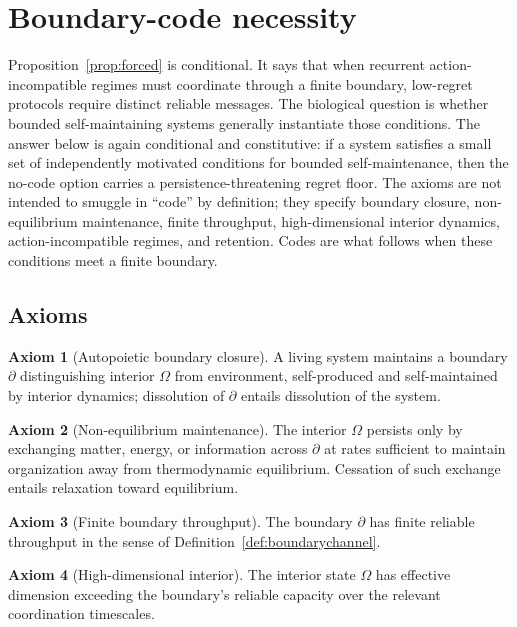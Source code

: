 \documentclass[12pt]{article}
\theoremstyle{definition}
\newtheorem{axiom}{Axiom}
\begin{document}
\section{Boundary-code necessity}
\label{sec:universal}

Proposition~\ref{prop:forced} is conditional. It says that when recurrent action-incompatible regimes must coordinate through a finite boundary, low-regret protocols require distinct reliable messages. The biological question is whether bounded self-maintaining systems generally instantiate those conditions. The answer below is again conditional and constitutive: if a system satisfies a small set of independently motivated conditions for bounded self-maintenance, then the no-code option carries a persistence-threatening regret floor. The axioms are not intended to smuggle in ``code'' by definition; they specify boundary closure, non-equilibrium maintenance, finite throughput, high-dimensional interior dynamics, action-incompatible regimes, and retention. Codes are what follows when these conditions meet a finite boundary.

\subsection{Axioms}

\begin{axiom}[Autopoietic boundary closure]
\label{ax:closure}
A living system maintains a boundary $\partial$ distinguishing interior $\Omega$ from environment, self-produced and self-maintained by interior dynamics; dissolution of $\partial$ entails dissolution of the system.
\end{axiom}

\begin{axiom}[Non-equilibrium maintenance]
\label{ax:nonequilibrium}
The interior $\Omega$ persists only by exchanging matter, energy, or information across $\partial$ at rates sufficient to maintain organization away from thermodynamic equilibrium. Cessation of such exchange entails relaxation toward equilibrium.
\end{axiom}

\begin{axiom}[Finite boundary throughput]
\label{ax:finite}
The boundary $\partial$ has finite reliable throughput in the sense of Definition~\ref{def:boundarychannel}.
\end{axiom}

\begin{axiom}[High-dimensional interior]
\label{ax:highd}
The interior state $\Omega$ has effective dimension exceeding the boundary's reliable capacity over the relevant coordination timescales.
\end{axiom}
\end{document}
